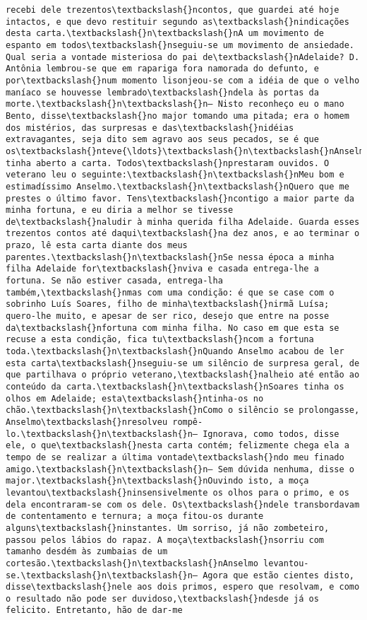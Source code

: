 \documentclass[11pt]{article}
\begin{document}
\begin{Verbatim}[commandchars=\\\{\}]
recebi dele trezentos\textbackslash{}ncontos, que guardei até hoje intactos, e que devo restituir segundo as\textbackslash{}nindicações desta carta.\textbackslash{}n\textbackslash{}nA um movimento de espanto em todos\textbackslash{}nseguiu-se um movimento de ansiedade. Qual seria a vontade misteriosa do pai de\textbackslash{}nAdelaide? D. Antônia lembrou-se que em rapariga fora namorada do defunto, e por\textbackslash{}num momento lisonjeou-se com a idéia de que o velho maníaco se houvesse lembrado\textbackslash{}ndela às portas da morte.\textbackslash{}n\textbackslash{}n— Nisto reconheço eu o mano Bento, disse\textbackslash{}no major tomando uma pitada; era o homem dos mistérios, das surpresas e das\textbackslash{}nidéias extravagantes, seja dito sem agravo aos seus pecados, se é que os\textbackslash{}nteve{\ldots}\textbackslash{}n\textbackslash{}nAnselmo tinha aberto a carta. Todos\textbackslash{}nprestaram ouvidos. O veterano leu o seguinte:\textbackslash{}n\textbackslash{}nMeu bom e estimadíssimo Anselmo.\textbackslash{}n\textbackslash{}nQuero que me prestes o último favor. Tens\textbackslash{}ncontigo a maior parte da minha fortuna, e eu diria a melhor se tivesse de\textbackslash{}naludir à minha querida filha Adelaide. Guarda esses trezentos contos até daqui\textbackslash{}na dez anos, e ao terminar o prazo, lê esta carta diante dos meus parentes.\textbackslash{}n\textbackslash{}nSe nessa época a minha filha Adelaide for\textbackslash{}nviva e casada entrega-lhe a fortuna. Se não estiver casada, entrega-lha também,\textbackslash{}nmas com uma condição: é que se case com o sobrinho Luís Soares, filho de minha\textbackslash{}nirmã Luísa; quero-lhe muito, e apesar de ser rico, desejo que entre na posse da\textbackslash{}nfortuna com minha filha. No caso em que esta se recuse a esta condição, fica tu\textbackslash{}ncom a fortuna toda.\textbackslash{}n\textbackslash{}nQuando Anselmo acabou de ler esta carta\textbackslash{}nseguiu-se um silêncio de surpresa geral, de que partilhava o próprio veterano,\textbackslash{}nalheio até então ao conteúdo da carta.\textbackslash{}n\textbackslash{}nSoares tinha os olhos em Adelaide; esta\textbackslash{}ntinha-os no chão.\textbackslash{}n\textbackslash{}nComo o silêncio se prolongasse, Anselmo\textbackslash{}nresolveu rompê-lo.\textbackslash{}n\textbackslash{}n— Ignorava, como todos, disse ele, o que\textbackslash{}nesta carta contém; felizmente chega ela a tempo de se realizar a última vontade\textbackslash{}ndo meu finado amigo.\textbackslash{}n\textbackslash{}n— Sem dúvida nenhuma, disse o major.\textbackslash{}n\textbackslash{}nOuvindo isto, a moça levantou\textbackslash{}ninsensivelmente os olhos para o primo, e os dela encontraram-se com os dele. Os\textbackslash{}ndele transbordavam de contentamento e ternura; a moça fitou-os durante alguns\textbackslash{}ninstantes. Um sorriso, já não zombeteiro, passou pelos lábios do rapaz. A moça\textbackslash{}nsorriu com tamanho desdém às zumbaias de um cortesão.\textbackslash{}n\textbackslash{}nAnselmo levantou-se.\textbackslash{}n\textbackslash{}n— Agora que estão cientes disto, disse\textbackslash{}nele aos dois primos, espero que resolvam, e como o resultado não pode ser duvidoso,\textbackslash{}ndesde já os felicito. Entretanto, hão de dar-me 
\end{Verbatim}
\end{document}
